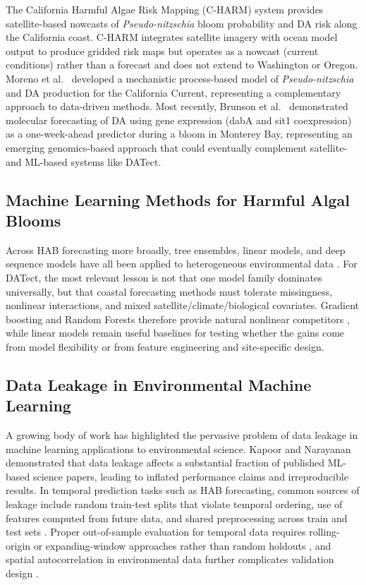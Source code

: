 \documentclass[toxins,article,submit,moreauthors]{Definitions/mdpi}
\begin{document}
The California Harmful Algae Risk Mapping (C-HARM) system \cite{Anderson2016} provides satellite-based nowcasts of \textit{Pseudo-nitzschia} bloom probability and DA risk along the California coast. C-HARM integrates satellite imagery with ocean model output to produce gridded risk maps but operates as a nowcast (current conditions) rather than a forecast and does not extend to Washington or Oregon. Moreno et al.\ \cite{Moreno2022} developed a mechanistic process-based model of \textit{Pseudo-nitzschia} and DA production for the California Current, representing a complementary approach to data-driven methods. Most recently, Brunson et al.\ \cite{Brunson2024} demonstrated molecular forecasting of DA using gene expression (dabA and sit1 coexpression) as a one-week-ahead predictor during a bloom in Monterey Bay, representing an emerging genomics-based approach that could eventually complement satellite- and ML-based systems like DATect.

\subsection{Machine Learning Methods for Harmful Algal Blooms}
\label{sec:rw-ml-habs}

Across HAB forecasting more broadly, tree ensembles, linear models, and deep sequence models have all been applied to heterogeneous environmental data \cite{Cruz2021, Shin2024, Hill2020, Yu2021, Manning2019}. For DATect, the most relevant lesson is not that one model family dominates universally, but that coastal forecasting methods must tolerate missingness, nonlinear interactions, and mixed satellite/climate/biological covariates. Gradient boosting and Random Forests therefore provide natural nonlinear competitors \cite{Friedman2001, Chen2016, Breiman2001}, while linear models remain useful baselines for testing whether the gains come from model flexibility or from feature engineering and site-specific design.

\subsection{Data Leakage in Environmental Machine Learning}
\label{sec:rw-leakage}

A growing body of work has highlighted the pervasive problem of data leakage in machine learning applications to environmental science. Kapoor and Narayanan \cite{Kapoor2023} demonstrated that data leakage affects a substantial fraction of published ML-based science papers, leading to inflated performance claims and irreproducible results. In temporal prediction tasks such as HAB forecasting, common sources of leakage include random train-test splits that violate temporal ordering, use of features computed from future data, and shared preprocessing across train and test sets \cite{Kaufman2012, Roberts2017, Bergmeir2012}. Proper out-of-sample evaluation for temporal data requires rolling-origin or expanding-window approaches rather than random holdouts \cite{Tashman2000}, and spatial autocorrelation in environmental data further complicates validation design \cite{Valavi2019}.
\end{document}
